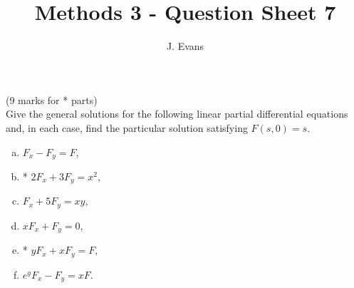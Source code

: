 \documentclass[12pt]{article}
\title{Methods 3 - Question Sheet 7}
\author{J. Evans}
\date{}
\begin{document}
\maketitle


\begin{question}(9 marks for * parts)\\
Give the general solutions for the following linear partial differential equations and, in each case, find the particular solution satisfying $F(s,0)=s$.
\begin{multicols}{2}
\begin{enumerate}[(a)]
\item $F_x-F_y=F$,
\item * $2F_x+3F_y=x^2$,
\item $F_x+5F_y=xy$,
\item $xF_x+F_y=0$,
\item * $yF_x+xF_y=F$,
\item $e^yF_x-F_y=xF$.
\end{enumerate}
\end{multicols}
\end{question}
\end{document}
